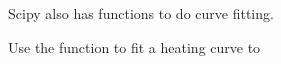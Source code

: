Scipy also has functions to do curve fitting.

\begin{problem}
Use the  function to fit a heating curve to 
\end{problem}





